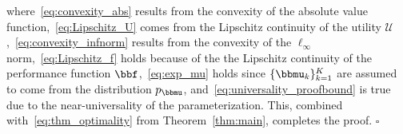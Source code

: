 where~\eqref{eq:convexity_abs} results from the convexity of the absolute value function,~\eqref{eq:Lipschitz_U} comes from the Lipschitz continuity of the utility $\mathcal{U}$,~\eqref{eq:convexity_infnorm} results from the convexity of the $\ell_{\infty}$ norm,~\eqref{eq:Lipschitz_f} holds because of the the Lipschitz continuity of the performance function $\bbf$,~\eqref{eq:exp_mu} holds since $\{\bbmu_k\}_{k=1}^K$ are assumed to come from the distribution $p_{\bbmu}$, and~\eqref{eq:universality_proofbound} is true due to the near-universality of the parameterization. This, combined with~\eqref{eq:thm_optimality} from Theorem~\ref{thm:main}, completes the proof.
\hfill$\square$%